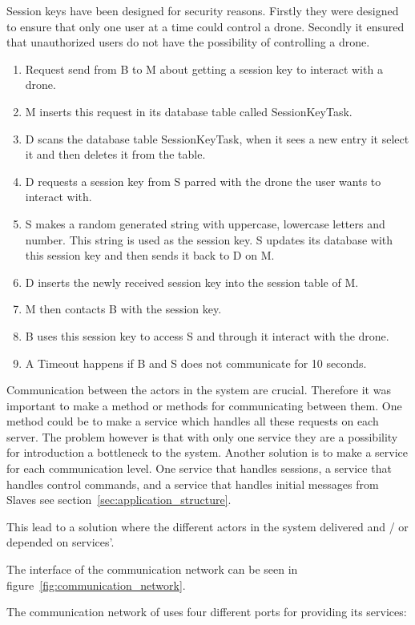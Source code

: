 Session keys have been designed for security reasons.
Firstly they were designed to ensure that only one user at a time could control a drone.
Secondly it ensured that unauthorized users do not have the possibility of controlling a drone.

\begin{enumerate}
	\item Request send from B to M about getting a session key to interact with a drone.
	\item M inserts this request in its database table called SessionKeyTask.
	\item D scans the database table SessionKeyTask, when it sees a new entry it select it and then deletes it from the table.
	\item D requests a session key from S parred with the drone the user wants to interact with.
	\item S makes a random generated string with uppercase, lowercase letters and number. This string is used as the session key. S updates its database with this session key and then sends it back to D on M.
	\item D inserts the newly received session key into the session table of M.
	\item M then contacts B with the session key.
	\item B uses this session key to access S and through it interact with the drone.
	\item A Timeout happens if B and S does not communicate for 10 seconds.
\end{enumerate}

Communication between the actors in the system are crucial. 
Therefore it was important to make a method or methods for communicating between them. 
One method could be to make a service which handles all these requests on each server. 
The problem however is that with only one service they are a possibility for introduction a bottleneck to the system.
Another solution is to make a service for each communication level. One service that handles sessions, a service that handles control commands, and a service that handles initial messages from Slaves see section~\ref{sec:application_structure}.

This lead to a solution where the different actors in the system delivered and / or depended on services'.

The interface of the communication network can be seen in figure~\ref{fig:communication_network}.

The communication network of \projectname{} uses four different ports for providing its services:


